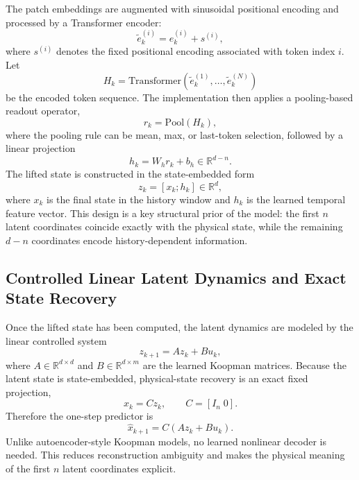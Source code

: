 \documentclass[journal]{IEEEtran}
\begin{document}
The patch embeddings are augmented with sinusoidal positional encoding and processed by a Transformer encoder:
\begin{equation}
    \tilde{e}_k^{(i)} = e_k^{(i)} + s^{(i)},
\end{equation}
where $s^{(i)}$ denotes the fixed positional encoding associated with token index $i$. Let
\begin{equation}
    H_k = \mathrm{Transformer}(\tilde{e}_k^{(1)},\ldots,\tilde{e}_k^{(N)})
\end{equation}
be the encoded token sequence. The implementation then applies a pooling-based readout operator,
\begin{equation}
    r_k = \mathrm{Pool}(H_k),
\end{equation}
where the pooling rule can be mean, max, or last-token selection, followed by a linear projection
\begin{equation}
    h_k = W_h r_k + b_h \in \mathbb{R}^{d-n}.
    \label{eq:history_feature}
\end{equation}
The lifted state is constructed in the state-embedded form
\begin{equation}
    z_k = [x_k;h_k] \in \mathbb{R}^{d},
    \label{eq:state_embedded_latent}
\end{equation}
where $x_k$ is the final state in the history window and $h_k$ is the learned temporal feature vector. This design is a key structural prior of the model: the first $n$ latent coordinates coincide exactly with the physical state, while the remaining $d-n$ coordinates encode history-dependent information.

\subsection{Controlled Linear Latent Dynamics and Exact State Recovery}

Once the lifted state has been computed, the latent dynamics are modeled by the linear controlled system
\begin{equation}
    z_{k+1} = A z_k + B u_k,
    \label{eq:learned_dynamics}
\end{equation}
where $A \in \mathbb{R}^{d\times d}$ and $B \in \mathbb{R}^{d\times m}$ are the learned Koopman matrices. Because the latent state is state-embedded, physical-state recovery is an exact fixed projection,
\begin{equation}
    x_k = C z_k, \qquad C=[I_n\;0].
    \label{eq:decoder_projection}
\end{equation}
Therefore the one-step predictor is
\begin{equation}
    \hat{x}_{k+1} = C(Az_k+Bu_k).
    \label{eq:one_step_prediction}
\end{equation}
Unlike autoencoder-style Koopman models, no learned nonlinear decoder is needed. This reduces reconstruction ambiguity and makes the physical meaning of the first $n$ latent coordinates explicit.
\end{document}
